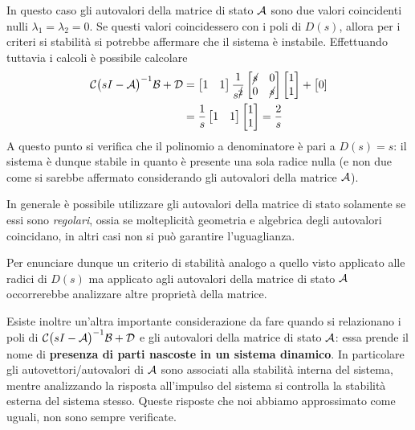 		In questo caso gli autovalori della matrice di stato $\mathcal A$ sono due valori coincidenti nulli $\lambda_1 = \lambda_2 = 0$. Se questi valori coincidessero con i poli di $D(s)$, allora per i criteri si stabilità si potrebbe affermare che il sistema è instabile. Effettuando tuttavia i calcoli è possibile calcolare
		\begin{align*}
			\mathcal C\big(sI- \mathcal A\big)^{-1}\mathcal B + \mathcal D & = \begin{bmatrix}
				1 & 1
			\end{bmatrix} \frac 1 {s^{\cancel{2}}} \begin{bmatrix}
				\cancel{s} & 0 \\ 0 & \cancel{s}
			\end{bmatrix} \begin{bmatrix}
				1 \\ 1 
			\end{bmatrix} + \big[0] \\
			& =\frac 1 s \begin{bmatrix}
				1 & 1
			\end{bmatrix}  \begin{bmatrix}
				1 \\ 1 
			\end{bmatrix} = \frac 2 s  
		\end{align*}
		A questo punto si verifica che il polinomio a denominatore è pari a $D(s) = s$: il sistema è dunque stabile in quanto è presente una sola radice nulla (e non due come si sarebbe affermato considerando gli autovalori della matrice $\mathcal A$).
		
		In generale è possibile utilizzare gli autovalori della matrice di stato solamente se essi sono \textit{regolari}, ossia se molteplicità geometria e algebrica degli autovalori coincidano, in altri casi non si può garantire l'uguaglianza.
		
		Per enunciare dunque un criterio di stabilità analogo a quello visto applicato alle radici di $D(s)$ ma applicato agli autovalori della matrice di stato $\mathcal A$ occorrerebbe analizzare altre proprietà della matrice. 
		
		\vspace{3mm}
		
		Esiste inoltre un'altra importante considerazione da fare quando si relazionano i poli di $\mathcal C\big(sI- \mathcal A\big)^{-1}\mathcal B + \mathcal D$ e gli autovalori della matrice di stato $\mathcal A$: essa prende il nome di \textbf{presenza di parti nascoste in un sistema dinamico}.  In particolare gli autovettori/autovalori di $\mathcal A$ sono associati alla stabilità interna del sistema, mentre analizzando la risposta all'impulso del sistema si controlla la stabilità esterna del sistema stesso. Queste risposte che noi abbiamo approssimato come uguali, non sono sempre verificate.
		
